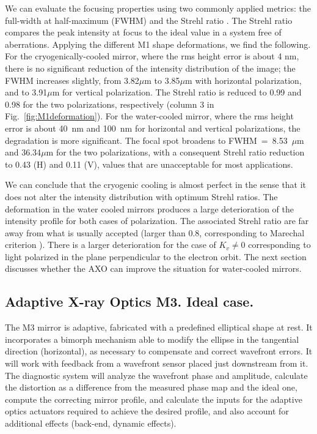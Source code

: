 \documentclass{iucr}
\begin{document}
We can evaluate the focusing properties using two commonly applied metrics: the full-width at half-maximum (FWHM) and the Strehl ratio \cite{Strehl}. The Strehl ratio compares the peak intensity at focus to the ideal value in a system free of aberrations. Applying the different M1 shape deformations, we find the following. For the cryogenically-cooled mirror, where the rms height error is about 4 nm, there is no significant reduction of the intensity distribution of the image; the FWHM increases slightly, from 3.82$\mu$m to 3.85$\mu$m with horizontal polarization, and to 3.91$\mu$m for vertical polarization. The Strehl ratio is reduced to 0.99 and 0.98 for the two polarizations, respectively (column 3 in Fig.~\ref{fig:M1deformation}). For the water-cooled mirror, where the rms height error is about 40~nm and 100~nm for horizontal and vertical polarizations, the degradation is more significant. The focal spot broadens to FWHM~=~8.53~$\mu$m and 36.34$\mu$m for the two polarizations, with a consequent Strehl ratio reduction to 0.43 (H) and 0.11 (V), values that are unacceptable for most applications. 

We can conclude that the cryogenic cooling is almost perfect in the sense that it does not alter the intensity distribution with optimum Strehl ratios. The deformation in the water cooled mirrors produces a large deterioration of the intensity profile for both cases of polarization. The associated Strehl ratio are far away from what is usually accepted (larger than 0.8, corresponding to Marechal criterion \cite{Marechal} ). There is a larger deterioration for the case of $K_v\ne 0$ corresponding to light polarized in the plane perpendicular to the electron orbit. The next section discusses whether the AXO can improve the situation for water-cooled mirrors.    

\subsection{Adaptive X-ray Optics M3. Ideal case.}

The M3 mirror is adaptive, fabricated with a predefined elliptical shape at rest. It incorporates a bimorph mechanism able to modify the ellipse in the tangential direction (horizontal), as necessary to compensate and correct wavefront errors. It will work with feedback from a wavefront sensor placed just downstream from it. The diagnostic system will analyze the wavefront phase and amplitude, calculate the distortion as a difference from the measured phase map and the ideal one, compute the correcting mirror profile, and calculate the inputs for the adaptive optics actuators required to achieve the desired profile, and also account for additional effects (back-end, dynamic effects).
\end{document}
